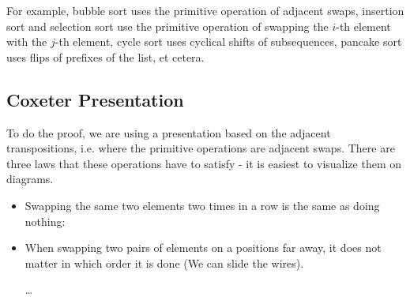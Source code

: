 For example, bubble sort uses the primitive operation of adjacent swaps,
insertion sort and selection sort use the primitive operation of swapping the
$i$-th element with the $j$-th element, cycle sort uses cyclical shifts of
subsequences, pancake sort uses flips of prefixes of the list, et cetera.

\subsection{Coxeter Presentation}

To do the proof, we are using a presentation based on the adjacent
transpositions, i.e. where the primitive operations are adjacent swaps. There
are three laws that these operations have to satisfy - it is easiest to
visualize them on diagrams.
\begin{itemize}
\item Swapping the same two elements two times in a row is the same as doing nothing:
    \hspace{1cm}
    \hspace{1cm}
\item When swapping two pairs of elements on a positions far away, it does not
matter in which order it is done (We can slide the wires).
    \hspace{0cm}
    \dots
    \hspace{0cm}

\end{itemize}
